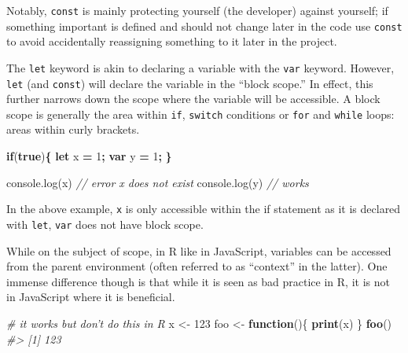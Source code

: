 \documentclass[10pt,]{krantz}
\makeatletter
\newenvironment{Shaded}{\begin{snugshade}}{\end{snugshade}}
\newcommand{\AttributeTok}[1]{\textcolor[rgb]{0.61,0.61,0.61}{#1}}
\newcommand{\CommentTok}[1]{\textcolor[rgb]{0.37,0.37,0.37}{\textit{#1}}}
\newcommand{\ControlFlowTok}[1]{\textcolor[rgb]{0.27,0.27,0.27}{\textbf{#1}}}
\newcommand{\DecValTok}[1]{\textcolor[rgb]{0.06,0.06,0.06}{#1}}
\newcommand{\KeywordTok}[1]{\textcolor[rgb]{0.27,0.27,0.27}{\textbf{#1}}}
\newcommand{\NormalTok}[1]{#1}
\newcommand{\OperatorTok}[1]{\textcolor[rgb]{0.43,0.43,0.43}{\textbf{#1}}}
\newcommand{\StringTok}[1]{\textcolor[rgb]{0.5,0.5,0.5}{#1}}
\newcommand{\VariableTok}[1]{\textcolor[rgb]{0,0,0}{#1}}
\newenvironment{kframe}{%
\medskip{}
\setlength{\fboxsep}{.8em}
 \def\at@end@of@kframe{}%
 \ifinner\ifhmode%
  \def\at@end@of@kframe{\end{minipage}}%
  \begin{minipage}{\columnwidth}%
 \fi\fi%
 \def\FrameCommand##1{\hskip\@totalleftmargin \hskip-\fboxsep
 \colorbox{shadecolor}{##1}\hskip-\fboxsep
     \hskip-\linewidth \hskip-\@totalleftmargin \hskip\columnwidth}%
 \MakeFramed {\advance\hsize-\width
   \@totalleftmargin\z@ \linewidth\hsize
   \@setminipage}}%
 {\par\unskip\endMakeFramed%
 \at@end@of@kframe}
\renewenvironment{Shaded}{\begin{kframe}}{\end{kframe}}
\makeatother
\begin{document}
Notably, \texttt{const} is mainly protecting yourself (the developer) against yourself; if something important is defined and should not change later in the code use \texttt{const} to avoid accidentally reassigning something to it later in the project.

The \texttt{let} keyword is akin to declaring a variable with the \texttt{var} keyword. However, \texttt{let} (and \texttt{const}) will declare the variable in the ``block scope.'' In effect, this further narrows down the scope where the variable will be accessible. A block scope is generally the area within \texttt{if}, \texttt{switch} conditions or \texttt{for} and \texttt{while} loops: areas within curly brackets.

\begin{Shaded}
\begin{Highlighting}[]
\ControlFlowTok{if}\NormalTok{(}\KeywordTok{true}\NormalTok{)}\OperatorTok{\{}
  \KeywordTok{let}\NormalTok{ x }\OperatorTok{=} \DecValTok{1}\OperatorTok{;}
  \KeywordTok{var}\NormalTok{ y }\OperatorTok{=} \DecValTok{1}\OperatorTok{;}
\OperatorTok{\}}

\VariableTok{console}\NormalTok{.}\AttributeTok{log}\NormalTok{(x) }\CommentTok{// error x does not exist}
\VariableTok{console}\NormalTok{.}\AttributeTok{log}\NormalTok{(y) }\CommentTok{// works}
\end{Highlighting}
\end{Shaded}

In the above example, \texttt{x} is only accessible within the if statement as it is declared with \texttt{let}, \texttt{var} does not have block scope.

While on the subject of scope, in R like in JavaScript, variables can be accessed from the parent environment (often referred to as ``context'' in the latter). One immense difference though is that while it is seen as bad practice in R, it is not in JavaScript where it is beneficial.

\begin{Shaded}
\begin{Highlighting}[]
\CommentTok{# it works but don't do this in R}
\NormalTok{x <-}\StringTok{ }\DecValTok{123}
\NormalTok{foo <-}\StringTok{ }\ControlFlowTok{function}\NormalTok{()\{}
  \KeywordTok{print}\NormalTok{(x)}
\NormalTok{\}}
\KeywordTok{foo}\NormalTok{()}
\CommentTok{#> [1] 123}
\end{Highlighting}
\end{Shaded}
\end{document}
